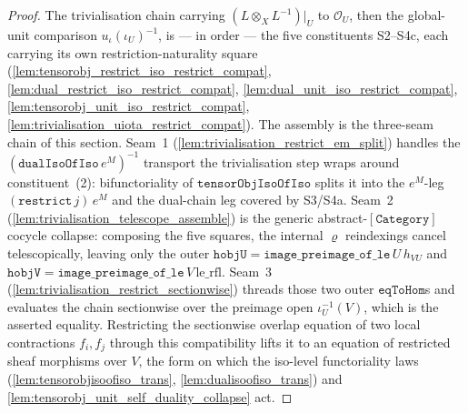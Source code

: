 \begin{proof}
  \leanok
  The trivialisation chain carrying \((L \otimes_X L^{-1})|_U\) to \(\mathcal{O}_U\), then the global-unit
  comparison \(u_\iota(\iota_U)^{-1}\), is --- in order --- the five constituents S2--S4c, each carrying
  its own restriction-naturality square (\cref{lem:tensorobj_restrict_iso_restrict_compat},
  \cref{lem:dual_restrict_iso_restrict_compat}, \cref{lem:dual_unit_iso_restrict_compat},
  \cref{lem:tensorobj_unit_iso_restrict_compat}, \cref{lem:trivialisation_uiota_restrict_compat}). The
  assembly is the three-seam chain of this section. Seam~1
  (\cref{lem:trivialisation_restrict_em_split}) handles the \((\mathtt{dualIsoOfIso}\,e^M)^{-1}\)
  transport the trivialisation step wraps around constituent~(2): bifunctoriality of
  \(\mathtt{tensorObjIsoOfIso}\) splits it into the \(e^M\)-leg \((\mathtt{restrict}\,j)\,e^M\) and the
  dual-chain leg covered by S3/S4a. Seam~2 (\cref{lem:trivialisation_telescope_assemble}) is the generic
  abstract-\([\mathtt{Category}]\) cocycle collapse: composing the five squares, the internal \(\varrho\)
  reindexings cancel telescopically, leaving only the outer
  \(\mathtt{hobjU} = \mathtt{image\_preimage\_of\_le}\,U\,h_{VU}\) and
  \(\mathtt{hobjV} = \mathtt{image\_preimage\_of\_le}\,V\,\mathrm{le\_rfl}\). Seam~3
  (\cref{lem:trivialisation_restrict_sectionwise}) threads those two outer \(\mathtt{eqToHom}\)s and
  evaluates the chain sectionwise over the preimage open \(\iota_U^{-1}(V)\), which is the asserted
  equality. Restricting the sectionwise overlap equation of two local contractions \(f_i, f_j\) through
  this compatibility lifts it to an equation of restricted sheaf morphisms over \(V\), the form on which
  the iso-level functoriality laws (\cref{lem:tensorobjisoofiso_trans}, \cref{lem:dualisoofiso_trans})
  and \cref{lem:tensorobj_unit_self_duality_collapse} act.
\end{proof}

